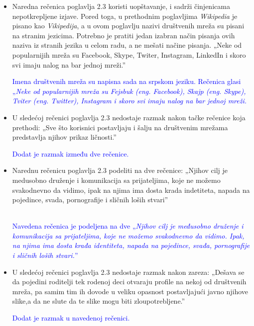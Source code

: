 \documentclass[a4paper]{report}
\newcommand{\odgovor}[1]{\textcolor{blue}{#1}}
\begin{document}
\begin{itemize}
    \item Naredna rečenica poglavlja 2.3 koristi uopštavanje, i sadrži činjenicama nepotkrepljene izjave. Pored toga, u prethodnim poglavljima \textit{Wikipedia} je pisano kao \textit{Vikipedija}, a u ovom poglavlju nazivi društvenih mreža su pisani na stranim jezicima. Potrebno je pratiti jedan izabran način pisanja ovih naziva iz stranih jezika u celom radu, a ne mešati načine pisanja. \newline
    „Neke od popularnijih mreža su Facebook, Skype, Twiter, Instagram, LinkedIn i skoro svi imaju nalog na bar jednoj mreži.”
   
    \odgovor{Imena društvenih mreža su napisna sada na srpskom jeziku. Rečenica glasi „\textit{Neke od popularnijih mreža su Fejsbuk (eng. Facebook), Skajp (eng. Skype), Tviter (eng. Twitter), Instagram i skoro svi imaju nalog na bar jednoj mreži.}}
    
\end{itemize}
\begin{itemize}
    \item U sledećoj rečenici poglavlja 2.3 nedostaje razmak nakon tačke rečenice koja prethodi:\newline
    „Sve što korisnici postavljaju i šalju na društvenim mrežama predstavlja njihov prikaz ličnosti.”
    
    \odgovor{Dodat je razmak između dve rečenice.}
    
\end{itemize}
\begin{itemize}
    \item Narednu rečenicu poglavlja 2.3 podeliti na dve rečenice:\newline
    „Njihov cilj je medusobno druženje i komunikacija sa prijateljima, koje ne možemo svakodnevno da vidimo, ipak na njima ima dosta krada indetiteta, napada na pojedince, svada, pornografije i sličnih loših stvari”
    
    \odgovor{\\Navedena rečenica je podeljena na dve „\textit{Njihov cilj je međusobno druženje i komunikacija sa prijateljima, koje ne možemo svakodnevno da vidimo. Ipak, na njima ima dosta krađa identiteta, napada na pojedince, svađa, pornografije i sličnih loših stvari.}”}
    
\end{itemize}
\begin{itemize}
    \item U sledećoj rečenici poglavlja 2.3 nedostaje razmak nakon zareza:\newline
    „Dešava se da pojedini roditelji tek rodenoj deci otvaraju profile na nekoj od društvenih mreža, pa samim tim ih dovode u veliku opasnost postavljajući javno njihove slike,a da ne slute da te slike mogu biti zloupotrebljene.”
   
    \odgovor{Dodat je razmak u navedenoj rečenici.}
    
\end{itemize}
\end{document}

